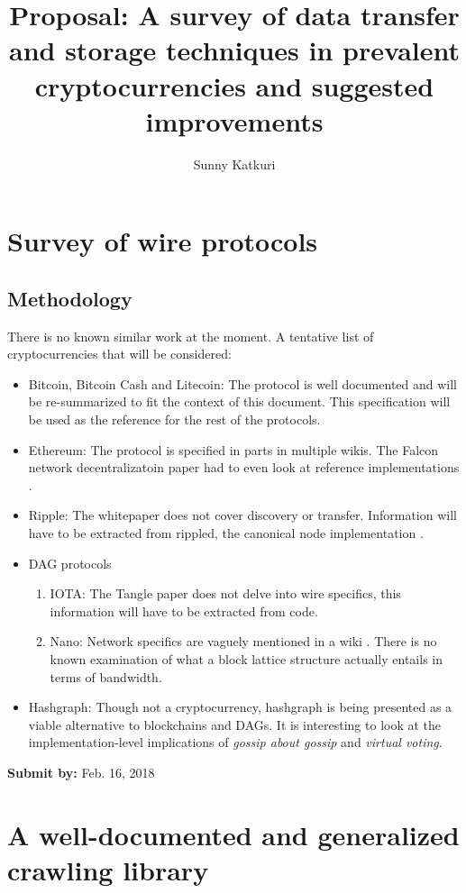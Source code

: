 \documentclass{article}
\title{Proposal: A survey of data transfer and storage techniques in prevalent cryptocurrencies and suggested improvements}
\author{Sunny Katkuri}
\date{}
\begin{document}
\maketitle

\section{Survey of wire protocols}
\subsection* {Methodology}
There is no known similar work at the moment. A tentative list of cryptocurrencies that will be considered:
\begin{itemize}
\item Bitcoin, Bitcoin Cash and Litecoin: The protocol is well documented and will be re-summarized to fit the context of this document. This specification will be used as the reference for the rest of the protocols.
\item Ethereum: The protocol is specified in parts in multiple wikis. The Falcon network decentralizatoin paper had to even look at reference implementations \cite{falcon-decentralization}.
\item Ripple: The whitepaper does not cover discovery or transfer. Information will have to be extracted from rippled, the canonical node implementation \cite{rippled}.
\item DAG protocols
    \begin{enumerate}
        \item IOTA: The Tangle paper \cite{tangle} does not delve into wire specifics, this information will have to be extracted from code.
        \item Nano: Network specifics are vaguely mentioned in a wiki \cite{nano_usage}. There is no known examination of what a block lattice structure \cite{nano} actually entails in terms of bandwidth.
    \end{enumerate}
\item Hashgraph: Though not a cryptocurrency, hashgraph \cite{hashgraph} is being presented as a viable alternative to blockchains and DAGs. It is interesting to look at the implementation-level implications of \textit{gossip about gossip} and \textit{virtual voting}.
\end{itemize}
\textbf{Submit by: } Feb. 16, 2018

\section{A well-documented and generalized crawling library}
\end{document}
